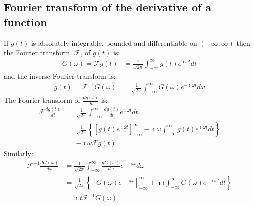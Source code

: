 \documentclass[a4paper,twoside,10pt,english]{report}
\begin{document}
\subsection{Fourier transform of the derivative of a function}
If $g\left(t\right)$ is absolutely integrable, bounded and differentiable on
$\left(-\infty{},\infty\right)$ then the Fourier transform, $\mathcal{F}$, of
$g\left(t\right)$ is:
\begin{align*}
G\left(\omega\right) = \mathcal{F}g\left(t\right) 
  &=\frac{1}{\sqrt{2\pi}}\int_{-\infty}^{\infty}
    g\left(t\right)e^{\imath\omega{}t}dt
\end{align*}
and the inverse Fourier transform is:
\begin{align*}
  g\left(t\right) = \mathcal{F}^{-1}G\left(\omega\right)
  &=\frac{1}{\sqrt{2\pi}}\int_{-\infty}^{\infty}
    G\left(\omega\right)e^{-\imath\omega{}t}d\omega
\end{align*}
The Fourier transform of $\frac{dg\left(t\right)}{dt}$ is:
\begin{align*} 
  \mathcal{F}\frac{dg\left(t\right)}{dt}
  &=\frac{1}{\sqrt{2\pi}}\int_{-\infty}^{\infty}
    \frac{dg\left(t\right)}{dt}e^{\imath\omega{}t}dt\\
  &=\frac{1}{\sqrt{2\pi}}
    \left\{\left[g\left(t\right)e^{\imath\omega{}t}\right]_{-\infty}^{\infty}
    -\imath\omega\int_{-\infty}^{\infty}g\left(t\right)e^{\imath\omega{}t}dt\right\}\\
  &=-\imath\omega\mathcal{F}g\left(t\right)
\end{align*}
Similarly:
\begin{align*} 
  \mathcal{F}^{-1}\frac{dG\left(\omega\right)}{d\omega} 
  &=\frac{1}{\sqrt{2\pi}}\int_{-\infty}^{\infty}
    \frac{dG\left(\omega\right)}{d\omega}e^{-\imath\omega{}t}d\omega\\
  &=\frac{1}{\sqrt{2\pi}}
    \left\{\left[G\left(\omega\right)e^{-\imath\omega{}t}\right]_{-\infty}^{\infty}
    +\imath{}t\int_{-\infty}^{\infty}G\left(\omega\right)
    e^{-\imath\omega{}t}dt\right\}\\
  &=\imath{}t\mathcal{F}^{-1}G\left(\omega\right)
\end{align*}
\end{document}
